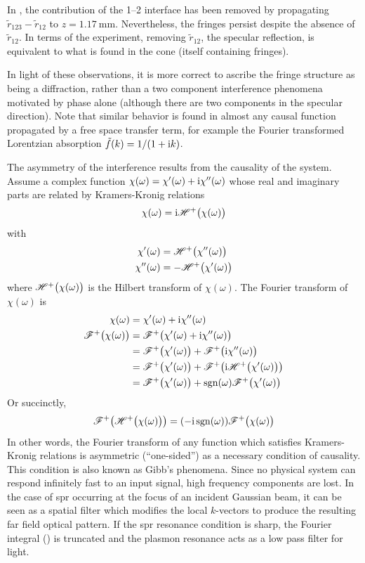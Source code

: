 In , the contribution of the 1--2 interface has been
removed by propagating $\tilde{r}_{123}-\tilde{r}_{12}$ to
$z=\SI{1.17}{\milli\meter}$.  Nevertheless, the fringes persist despite the
absence of $\tilde{r}_{12}$.  In terms of the experiment, removing
$\tilde{r}_{12}$, the specular reflection, is equivalent to what is found in
the cone (itself containing fringes).

In light of these observations, it is more correct to ascribe the fringe
structure as being a diffraction, rather than a two component interference
phenomena motivated by phase alone (although there are two components in the
specular direction).  Note that similar behavior is found in almost any causal
function propagated by a free space transfer term, for example the Fourier
transformed Lorentzian absorption $\tilde{f}(k) = 1/(1+{\mathrm{i}} k)$.

The asymmetry of the interference results from the causality of the system.
Assume a complex function $\chi(\omega) = \chi'(\omega) + {\mathrm{i}} \chi''(\omega)$
whose real and imaginary parts are related by Kramers-Kronig relations
\begin{align}
\chi(\omega)={\mathrm{i}} {\mathscr{H}^{+}\bigl(\chi(\omega)\bigr)}
\end{align}
with
\begin{align}
\chi'(\omega) &= {\mathscr{H}^{+}\bigl(\chi''(\omega)\bigr)}\\
\chi''(\omega) &= -{\mathscr{H}^{+}\bigl(\chi'(\omega)\bigr)}
\end{align}
where ${\mathscr{H}^{+}\bigl(\chi(\omega)\bigr)}$ is the Hilbert transform of $\chi(\omega)$.
The Fourier transform of $\chi(\omega)$ is
\begin{align}
\chi(\omega) &= \chi'(\omega) + {\mathrm{i}} \chi''(\omega)\\
{\mathscr{F}^{+}\bigl(\chi(\omega)\bigr)} &= {\mathscr{F}^{+}\bigl(\chi'(\omega) + {\mathrm{i}} \chi''(\omega)\bigr)}\\
&= {\mathscr{F}^{+}\bigl(\chi'(\omega)\bigr)} + {\mathscr{F}^{+}\bigl({\mathrm{i}} \chi''(\omega)\bigr)}\\
&= {\mathscr{F}^{+}\bigl(\chi'(\omega)\bigr)} + {\mathscr{F}^{+}\bigl({\mathrm{i}} {\mathscr{H}^{+}\bigl(\chi'(\omega)\bigr)}\bigr)} \\
&= {\mathscr{F}^{+}\bigl(\chi'(\omega)\bigr)} + \operatorname{sgn}(\omega) {\mathscr{F}^{+}\bigl(\chi'(\omega)\bigr)} \\
\end{align}
Or succinctly,
\begin{align}
{\mathscr{F}^{+}\bigl({\mathscr{H}^{+}\bigl(\chi(\omega)\bigr)}\bigr)} = (-{\mathrm{i}} \operatorname{sgn}(\omega)) {\mathscr{F}^{+}\bigl(\chi(\omega)\bigr)}
\end{align}
In other words, the Fourier transform of any function which satisfies
Kramers-Kronig relations is asymmetric (``one-sided'') as a necessary
condition of causality.  This condition is also known as Gibb's phenomena.
Since no physical system can respond infinitely fast to an input signal, high
frequency components are lost.  In the case of \gls{spr} occurring at the focus of
an incident Gaussian beam, it can be seen as a spatial filter which modifies
the local $k$-vectors to produce the resulting far field optical pattern.  If
the \gls{spr} resonance condition is sharp, the Fourier integral
() is truncated and the plasmon resonance acts as a
low pass filter for light.

